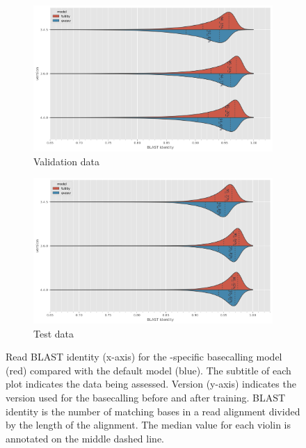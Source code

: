 \begin{figure}
     \centering
     \begin{subfigure}[b]{0.9\textwidth}
        \includegraphics[width=1\linewidth]{Chapter4/Figs/read_blast_identity.png}
        \centering
        \caption{Validation data}
        \label{fig:eval-read-blast}
     \end{subfigure}
     \hfill
     \begin{subfigure}[b]{0.9\textwidth}
         \centering
        \includegraphics[width=1\linewidth]{Chapter4/Figs/test_read_blast_identity.png}
         \caption{Test data}
         \label{fig:test-read-blast}
     \end{subfigure}
    \caption{Read BLAST identity (x-axis) for the \mtb{}-specific basecalling model \tubby{} (red) compared with the default \guppy{} model (blue). The subtitle of each plot indicates the data being assessed. Version (y-axis) indicates the \guppy{} version used for the basecalling before and after training. BLAST identity is the number of matching bases in a read alignment divided by the length of the alignment. The median value for each violin is annotated on the middle dashed line.}
        \label{fig:read-blast}
\end{figure}

